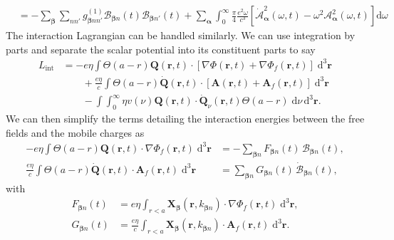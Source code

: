 \documentclass{article}
\begin{document}
\begin{equation}
\begin{split}
&= - \sum_{\bm{\beta}}\sum_{nn'}g_{\bm{\beta}nn'}^{(1)}\mathcal{B}_{\bm{\beta}n}(t)\mathcal{B}_{\bm{\beta}n'}(t) + \sum_{\bm{\alpha}}\int_0^\infty\frac{\pi}{4}\frac{e^2\omega}{c^3}\left[\dot{\mathcal{A}}_{\bm{\alpha}}^2(\omega,t) - \omega^2\mathcal{A}_{\bm{\alpha}}^2(\omega,t)\right]\mathrm{d}\omega
\end{split}
\end{equation}
The interaction Lagrangian can be handled similarly. We can use integration by parts and separate the scalar potential into its constituent parts to say
\begin{equation}
\begin{split}
L_\mathrm{int} &=
-e\eta\int\Theta(a - r)\mathbf{Q}(\mathbf{r},t)\cdot\left[\nabla\Phi(\mathbf{r},t) + \nabla\Phi_f(\mathbf{r},t)\right]\;\mathrm{d}^3\mathbf{r}\\
&\qquad + \frac{e\eta}{c}\int\Theta(a - r)\dot{\mathbf{Q}}(\mathbf{r},t)\cdot\left[\mathbf{A}(\mathbf{r},t) + \mathbf{A}_f(\mathbf{r},t)\right]\;\mathrm{d}^3\mathbf{r}\\
&\qquad- \int\int_0^\infty \eta v(\nu)\mathbf{Q}(\mathbf{r},t)\cdot\dot{\mathbf{Q}}_\nu(\mathbf{r},t)\Theta(a - r)\;\mathrm{d}\nu\,\mathrm{d}^3\mathbf{r}.
\end{split}
\end{equation}
We can then simplify the terms detailing the interaction energies between the free fields and the mobile charges as
\begin{equation}
\begin{split}
-e\eta\int\Theta(a - r)\mathbf{Q}(\mathbf{r},t)\cdot\nabla\Phi_f(\mathbf{r},t)\;\mathrm{d}^3\mathbf{r} &= -\sum_{\bm{\beta}n}F_{\bm{\beta}n}(t)\,\mathcal{B}_{\bm{\beta}n}(t),\\
\frac{e\eta}{c}\int\Theta(a - r)\dot{\mathbf{Q}}(\mathbf{r},t)\cdot\mathbf{A}_f(\mathbf{r},t)\;\mathrm{d}^3\mathbf{r} &= \sum_{\bm{\beta}n}G_{\bm{\beta}n}(t)\,\dot{\mathcal{B}}_{\bm{\beta}n}(t),
\end{split}
\end{equation}
with
\begin{equation}
\begin{split}
F_{\bm{\beta}n}(t) &= e\eta\int_{r<a}\mathbf{X}_{\bm{\beta}}(\mathbf{r},k_{\bm{\beta}n})\cdot\nabla\Phi_f(\mathbf{r},t)\;\mathrm{d}^3\mathbf{r},\\
G_{\bm{\beta}n}(t) &= \frac{e\eta}{c}\int_{r<a}\mathbf{X}_{\bm{\beta}}(\mathbf{r},k_{\bm{\beta}n})\cdot\mathbf{A}_f(\mathbf{r},t)\;\mathrm{d}^3\mathbf{r}.\\
\end{split}
\end{equation}
\end{document}

